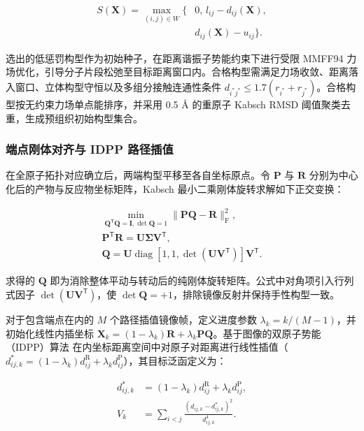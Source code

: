\begin{equation}\label{eq:methods-06}
\begin{aligned}
S(\mathbf{X})=\max_{(i,j)\in W}\{&0,\,l_{ij}-d_{ij}(\mathbf{X}),\\
&d_{ij}(\mathbf{X})-u_{ij}\}.
\end{aligned}
\end{equation}

选出的低惩罚构型作为初始种子，在距离谐振子势能约束下进行受限 MMFF94 力场优化，引导分子片段松弛至目标距离窗口内。合格构型需满足力场收敛、距离落入窗口、立体构型守恒以及多组分接触连通性条件 $d_{i^*j^*}\le 1.7(r_{i^*}+r_{j^*})$。合格构型按无约束力场单点能排序，并采用 0.5 Å 的重原子 Kabsch RMSD 阈值聚类去重，生成预组织初始构型集合。

\subsubsection{端点刚体对齐与 IDPP 路径插值}
在全原子拓扑对应确立后，两端构型平移至各自坐标原点。令 $\mathbf{P}$ 与 $\mathbf{R}$ 分别为中心化后的产物与反应物坐标矩阵，Kabsch 最小二乘刚体旋转求解如下正交变换：

\begin{equation}\label{eq:methods-07}
\begin{gathered}
\min_{\mathbf{Q}^{\mathsf{T}}\mathbf{Q}=\mathbf{I},\det\mathbf{Q}=1}\|\mathbf{P}\mathbf{Q}-\mathbf{R}\|_{\mathrm{F}}^2,\\
\mathbf{P}^{\mathsf{T}}\mathbf{R}=\mathbf{U}\boldsymbol{\Sigma}\mathbf{V}^{\mathsf{T}},\\
\mathbf{Q}=\mathbf{U}\operatorname{diag}[1,1,\det(\mathbf{U}\mathbf{V}^{\mathsf{T}})]\mathbf{V}^{\mathsf{T}}.
\end{gathered}
\end{equation}

求得的 $\mathbf{Q}$ 即为消除整体平动与转动后的纯刚体旋转矩阵。公式中对角项引入行列式因子 $\det(\mathbf{U}\mathbf{V}^{\mathsf{T}})$，使 $\det\mathbf{Q}=+1$，排除镜像反射并保持手性构型一致。

对于包含端点在内的 $M$ 个路径插值镜像帧，定义进度参数 $\lambda_k=k/(M-1)$，并初始化线性内插坐标 $\mathbf{X}_k=(1-\lambda_k)\mathbf{R}+\lambda_k\mathbf{P}\mathbf{Q}$。基于图像的双原子势能（IDPP）算法 \citep{ref08} 在内坐标距离空间中对原子对距离进行线性插值（$d_{ij,k}^*=(1-\lambda_k)d_{ij}^{\mathrm{R}}+\lambda_k d_{ij}^{\mathrm{P}}$），其目标泛函定义为：

\begin{equation}\label{eq:methods-08}
\begin{aligned}
d_{ij,k}^*&=(1-\lambda_k)d_{ij}^{\mathrm{R}}+\lambda_k d_{ij}^{\mathrm{P}},\\
V_k&=\sum_{i<j}\frac{(d_{ij,k}-d_{ij,k}^*)^2}{d_{ij,k}^4}.
\end{aligned}
\end{equation}

